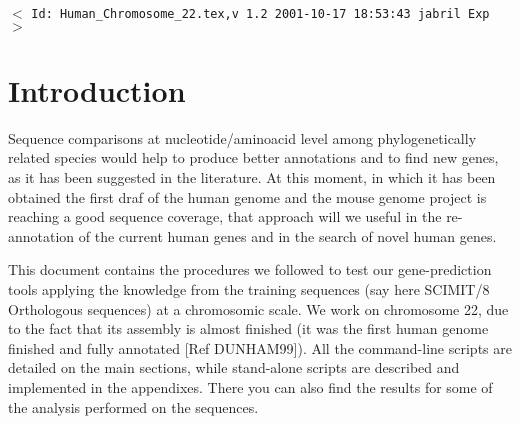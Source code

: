 \documentclass[11pt]{article}
\newcommand{\sctn}[1]{\section{#1}}
\begin{document}
\tableofcontents
\listoftables
\listoffigures

\vfill
\begin{center}
{\small$<$ \verb$Id: Human_Chromosome_22.tex,v 1.2 2001-10-17 18:53:43 jabril Exp $$>$ }
\end{center}


\newpage
{}
\setcounter{page}{1}

\sctn{Introduction}

Sequence comparisons at nucleotide/aminoacid level among phylogenetically related species would help to produce better annotations and to find new genes, as it has been suggested in the literature. At this moment, in which it has been obtained the first draf of the human genome and the mouse genome project is reaching a good sequence coverage, that approach will we useful in the re-annotation of the current human genes and in the search of novel human genes. 
\begin{comment}
Homology between human and mouse sequences serves as a useful guide for identifying genes in both organisms. Additionally, conserved sequences that have no coding potential are good candidates for regulatory elements.
-- From \url|http://bio.cse.psu.edu/mousegroup/doc.html|
An annotation of the orthologous test set of genomic sequences and their regulatory regions is available at \url|http://bio.cse.psu.edu/mousegroup/test8/|
\end{comment}

This document contains the procedures we followed to test our gene-prediction tools applying the knowledge from the training sequences (say here SCIMIT/8 Orthologous sequences) at a chromosomic scale. We work on chromosome 22, due to the fact that its assembly is almost finished (it was the first human genome finished and fully annotated [Ref DUNHAM99]). All the command-line scripts are detailed on the main sections, while stand-alone scripts are described and implemented in the appendixes. There you can also find the results for some of the analysis performed on the sequences. 
\end{document}

